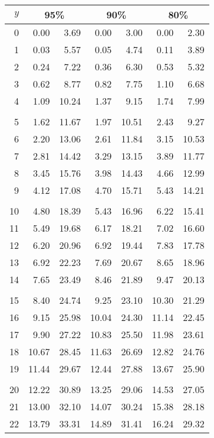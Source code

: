 \documentclass[letterpaper,11pt,twoside,]{pinp}
\begin{document}
\begin{table}[h]
\begin{center}
\begin{tabular}{|r|rr|rr|rr|}
\hline
$y$ & \multicolumn{2}{c}{95\%} & \multicolumn{2}{c}{90\%} & \multicolumn{2}{c}{80\%} \\
\hline
0 & 0.00 & 3.69 & 0.00 & 3.00 & 0.00 & 2.30 \\
1 & 0.03 & 5.57 & 0.05 & 4.74 & 0.11 & 3.89 \\
2 & 0.24 & 7.22 & 0.36 & 6.30 & 0.53 & 5.32 \\
3 & 0.62 & 8.77 & 0.82 & 7.75 & 1.10 & 6.68 \\
4 & 1.09 & 10.24 & 1.37 & 9.15 & 1.74 & 7.99 \\
& & & & & &  \\
5 & 1.62 & 11.67 & 1.97 & 10.51 & 2.43 & 9.27 \\
6 & 2.20 & 13.06 & 2.61 & 11.84 & 3.15 & 10.53 \\
7 & 2.81 & 14.42 & 3.29 & 13.15 & 3.89 & 11.77 \\
8 & 3.45 & 15.76 & 3.98 & 14.43 & 4.66 & 12.99 \\
9 & 4.12 & 17.08 & 4.70 & 15.71 & 5.43 & 14.21 \\
& & & & & &  \\
10 & 4.80 & 18.39 & 5.43 & 16.96 & 6.22 & 15.41 \\
11 & 5.49 & 19.68 & 6.17 & 18.21 & 7.02 & 16.60 \\
12 & 6.20 & 20.96 & 6.92 & 19.44 & 7.83 & 17.78 \\
13 & 6.92 & 22.23 & 7.69 & 20.67 & 8.65 & 18.96 \\
14 & 7.65 & 23.49 & 8.46 & 21.89 & 9.47 & 20.13 \\
& & & & & &  \\
15 & 8.40 & 24.74 & 9.25 & 23.10 & 10.30 & 21.29 \\
16 & 9.15 & 25.98 & 10.04 & 24.30 & 11.14 & 22.45 \\
17 & 9.90 & 27.22 & 10.83 & 25.50 & 11.98 & 23.61 \\
18 & 10.67 & 28.45 & 11.63 & 26.69 & 12.82 & 24.76 \\
19 & 11.44 & 29.67 & 12.44 & 27.88 & 13.67 & 25.90 \\
& & & & & &  \\
20 & 12.22 & 30.89 & 13.25 & 29.06 & 14.53 & 27.05 \\
21 & 13.00 & 32.10 & 14.07 & 30.24 & 15.38 & 28.18 \\
22 & 13.79 & 33.31 & 14.89 & 31.41 & 16.24 & 29.32 \\

\end{tabular}
\end{center}
\end{table}
\end{document}

